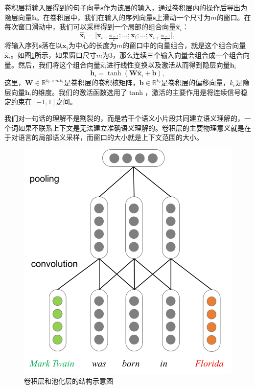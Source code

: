 卷积层将输入层得到的句子向量$\mathbf{s}$作为该层的输入，通过卷积层内的操作后导出为隐层向量$\mathbf{h}$。在卷积层中，我们在输入的序列向量$\mathbf{s}$上滑动一个尺寸为$m$的窗口。在每次窗口滑动中，我们可以采样得到一个局部的组合向量$\mathbf{\hat{x}}_i$：
\begin{equation}
\mathbf{\hat{x}}_i = \big[ \mathbf{x}_{i - \frac{m-1}{2}}; \ldots ; \mathbf{x}_i; \ldots ;\mathbf{x}_{i + \frac{m-1}{2}} \big],
\end{equation}
将输入序列$\mathbf{s}$落在以$\mathbf{x}_i$为中心的长度为$m$的窗口中的向量组合，就是这个组合向量$\mathbf{\hat{x}}_i$。如图\ref{fig3:conv_pooling}所示，如果窗口尺寸$m$为$3$，那么连续三个输入向量会组合成一个组合向量。然后，我们将这个组合向量$\mathbf{\hat{x}}_i$进行线性变换以及激活从而得到隐层向量$\mathbf{h}_i$
\begin{equation}
\mathbf{h}_i = \tanh(\mathbf{W}\mathbf{\hat{x}}_i + \mathbf{b}),
\end{equation}
这里，$\mathbf{W} \in \mathbb{R}^{k_c \times mk_i}$是卷积层的卷积核矩阵，$\mathbf{b} \in \mathbb{R}^{k_c}$是卷积层的偏移向量，$k_c$是隐层向量$\mathbf{h}_i$的维度。我们的激活函数选用了$\tanh$，激活的主要作用是将连续信号稳定约束在$[-1,1]$之间。

我们对一句话的理解不是割裂的，而是若干个语义小片段共同建立语义理解的，一个词如果不联系上下文是无法建立准确语义理解的。卷积层的主要物理意义就是在于对语言的局部语义采样，而窗口的大小就是上下文范围的大小。

\begin{figure}[h]
\centering
\includegraphics[width=0.7\columnwidth]{figures/ch3/cnn_concrete.png}
\caption{卷积层和池化层的结构示意图}
\label{fig3:conv_pooling}
\end{figure}



